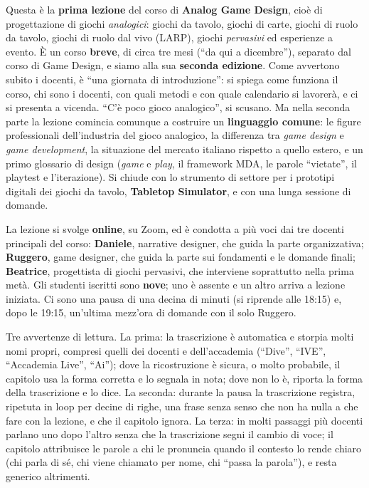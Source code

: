 Questa è la \textbf{prima lezione} del corso di \textbf{Analog Game Design},
cioè di progettazione di giochi \emph{analogici}: giochi da tavolo, giochi di
carte, giochi di ruolo da tavolo, giochi di ruolo dal vivo (LARP), giochi
\emph{pervasivi} ed esperienze a evento. È un corso \textbf{breve}, di circa tre
mesi (``da qui a dicembre''), separato dal corso di Game Design, e siamo alla sua
\textbf{seconda edizione}. Come avvertono subito i docenti, è ``una giornata di
introduzione'': si spiega come funziona il corso, chi sono i docenti, con quali
metodi e con quale calendario si lavorerà, e ci si presenta a vicenda. ``C'è poco
gioco analogico'', si scusano. Ma nella seconda parte la lezione comincia
comunque a costruire un \textbf{linguaggio comune}: le figure professionali
dell'industria del gioco analogico, la differenza tra \emph{game design} e
\emph{game development}, la situazione del mercato italiano rispetto a quello
estero, e un primo glossario di design (\emph{game} e \emph{play}, il framework
MDA, le parole ``vietate'', il playtest e l'iterazione). Si chiude con lo
strumento di settore per i prototipi digitali dei giochi da tavolo,
\textbf{Tabletop Simulator}, e con una lunga sessione di domande.

La lezione si svolge \textbf{online}, su Zoom, ed è condotta a più voci dai tre
docenti principali del corso: \textbf{Daniele}, narrative designer, che guida la
parte organizzativa; \textbf{Ruggero}, game designer, che guida la parte sui
fondamenti e le domande finali; \textbf{Beatrice}, progettista di giochi
pervasivi, che interviene soprattutto nella prima metà. Gli studenti iscritti
sono \textbf{nove}; uno è assente e un altro arriva a lezione iniziata. Ci sono
una pausa di una decina di minuti (si riprende alle 18:15) e, dopo le 19:15,
un'ultima mezz'ora di domande con il solo Ruggero.

Tre avvertenze di lettura. La prima: la trascrizione è automatica e storpia
molti nomi propri, compresi quelli dei docenti e dell'accademia (``Dive'',
``IVE'', ``Accademia Live'', ``Ai''); dove la ricostruzione è sicura, o molto
probabile, il capitolo usa la forma corretta e lo segnala in nota; dove non lo
è, riporta la forma della trascrizione e lo dice. La seconda: durante la pausa la
trascrizione registra, ripetuta in loop per decine di righe, una frase senza
senso che non ha nulla a che fare con la lezione, e che il capitolo ignora. La
terza: in molti passaggi più docenti parlano uno dopo l'altro senza che la
trascrizione segni il cambio di voce; il capitolo attribuisce le parole a chi le
pronuncia quando il contesto lo rende chiaro (chi parla di sé, chi viene
chiamato per nome, chi ``passa la parola''), e resta generico altrimenti.

